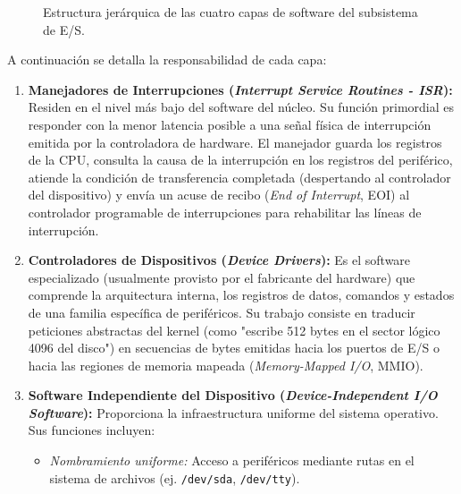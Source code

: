 \documentclass[11pt,letterpaper]{article}
\begin{document}
\begin{figure}[htbp]
\caption{Estructura jerárquica de las cuatro capas de software del subsistema de E/S.}
\label{fig:capas_io}
\end{figure}

A continuación se detalla la responsabilidad de cada capa:
\begin{enumerate}
    \item \textbf{Manejadores de Interrupciones (\textit{Interrupt Service Routines - ISR}):} Residen en el nivel más bajo del software del núcleo. Su función primordial es responder con la menor latencia posible a una señal física de interrupción emitida por la controladora de hardware. El manejador guarda los registros de la CPU, consulta la causa de la interrupción en los registros del periférico, atiende la condición de transferencia completada (despertando al controlador del dispositivo) y envía un acuse de recibo (\textit{End of Interrupt}, EOI) al controlador programable de interrupciones para rehabilitar las líneas de interrupción.
    \item \textbf{Controladores de Dispositivos (\textit{Device Drivers}):} Es el software especializado (usualmente provisto por el fabricante del hardware) que comprende la arquitectura interna, los registros de datos, comandos y estados de una familia específica de periféricos. Su trabajo consiste en traducir peticiones abstractas del kernel (como "escribe 512 bytes en el sector lógico 4096 del disco") en secuencias de bytes emitidas hacia los puertos de E/S o hacia las regiones de memoria mapeada (\textit{Memory-Mapped I/O}, MMIO).
    \item \textbf{Software Independiente del Dispositivo (\textit{Device-Independent I/O Software}):} Proporciona la infraestructura uniforme del sistema operativo. Sus funciones incluyen:
    \begin{itemize}
        \item \textit{Nombramiento uniforme:} Acceso a periféricos mediante rutas en el sistema de archivos (ej. \texttt{/dev/sda}, \texttt{/dev/tty}).

\end{itemize}
\end{enumerate}
\end{document}

